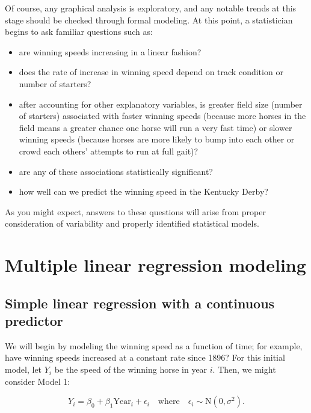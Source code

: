 \documentclass[
]{krantz}
\providecommand{\tightlist}{%
  \setlength{\itemsep}{0pt}\setlength{\parskip}{0pt}}
\begin{document}
Of course, any graphical analysis is exploratory, and any notable trends at this stage should be checked through formal modeling. At this point, a statistician begins to ask familiar questions such as:

\begin{itemize}
\tightlist
\item
  are winning speeds increasing in a linear fashion?
\item
  does the rate of increase in winning speed depend on track condition or number of starters?
\item
  after accounting for other explanatory variables, is greater field size (number of starters) associated with faster winning speeds (because more horses in the field means a greater chance one horse will run a very fast time) or slower winning speeds (because horses are more likely to bump into each other or crowd each others' attempts to run at full gait)?
\item
  are any of these associations statistically significant?
\item
  how well can we predict the winning speed in the Kentucky Derby?
\end{itemize}

As you might expect, answers to these questions will arise from proper consideration of variability and properly identified statistical models.

\hypertarget{multreg}{%
\section{Multiple linear regression modeling}\label{multreg}}

\hypertarget{SLRcontinuous}{%
\subsection{Simple linear regression with a continuous predictor}\label{SLRcontinuous}}

We will begin by modeling the winning speed as a function of time; for example, have winning speeds increased at a constant rate since 1896? For this initial model, let \(Y_{i}\) be the speed of the winning horse in year \(i\). Then, we might consider Model 1:

\begin{equation}
 Y_{i}=\beta_{0}+\beta_{1}\textrm{Year}_{i}+\epsilon_{i} \quad \textrm{where} \quad \epsilon_{i}\sim \textrm{N}(0,\sigma^2).
\label{eq:model1}
\end{equation}
\end{document}
